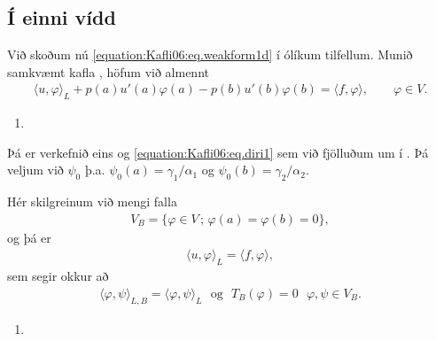 \documentclass[a4paper,10pt,icelandic]{sphinxmanual}
\begin{document}
\subsection{Í einni vídd}
\label{\detokenize{Kafli06:i-einni-vidd}}
Við skoðum nú \eqref{equation:Kafli06:eq.weakform1d} í ólíkum tilfellum.
Munið samkvæmt kafla {\hyperref[\detokenize{Kafli06:ch-6-1-2}]{}}, höfum við almennt
\begin{equation}\label{equation:Kafli06:eq.form1dgen}
\begin{split}{{\langle u,\varphi\rangle}}_L + p(a)u'(a)\varphi(a)-p(b)u'(b)\varphi(b)
= {{\langle f,\varphi\rangle}}, \qquad \varphi\in V.\end{split}
\end{equation}\begin{enumerate}
\def\theenumi{\Roman{enumi}}
\def\labelenumi{\theenumi .}
\makeatletter\def\p@enumii{\p@enumi \theenumi .}\makeatother
\item {} 

\end{enumerate}

Þá er verkefnið eins og \eqref{equation:Kafli06:eq.diri1} sem við  fjölluðum um í {\hyperref[\detokenize{Kafli06:ch-6-2-1}]{}}. Þá veljum við \(\psi_0\) þ.a. \(\psi_0(a)=\gamma_1/\alpha_1\) og \(\psi_0(b)=\gamma_2/\alpha_2\).

Hér skilgreinum við mengi falla
\begin{equation*}
\begin{split}V_B=\{\varphi\in V\,;\, \varphi(a)=\varphi(b)=0\},\end{split}
\end{equation*}
og þá er
\begin{equation*}
\begin{split}{{\langle u,\varphi\rangle}}_L={{\langle f,\varphi\rangle}},\end{split}
\end{equation*}
sem segir okkur að
\begin{equation*}
\begin{split}{{\langle \varphi,\psi\rangle}}_{L,B}={{\langle \varphi,\psi\rangle}}_L ~~~\text{og}~~~ T_B(\varphi)=0 ~~~ \varphi,\psi\in V_B.\end{split}
\end{equation*}\begin{enumerate}
\def\theenumi{\Roman{enumi}}
\def\labelenumi{\theenumi .}
\makeatletter\def\p@enumii{\p@enumi \theenumi .}\makeatother
\setcounter{enumi}{1}
\item {} 

\end{enumerate}
\end{document}
